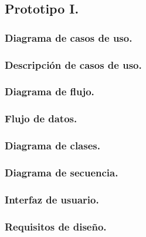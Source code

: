\documentclass[12pt, a4paper, titlepage]{article}
\begin{document}
		\subsection{Prototipo I.}
			\subsubsection{Diagrama de casos de uso.}
			\subsubsection{Descripción de casos de uso.}
			\subsubsection{Diagrama 	de flujo.}
			\subsubsection{Flujo de datos.}
			\subsubsection{Diagrama de clases.}
			\subsubsection{Diagrama de secuencia.}
			\subsubsection{Interfaz de usuario.}
			\subsubsection{Requisitos de diseño.}
			
\end{document}
